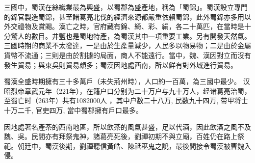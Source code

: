 三國中，蜀漢在絲織業最為興盛，以蜀郡為盛產地，稱為「蜀錦」。蜀漢設立專門的錦官製造蜀錦，甚至諸葛亮北伐的經濟來源都嚴重依賴蜀錦，此外蜀錦亦多用以外交禮物及賞賜。漢亡之時，官府藏有錦、綺、彩、絹，各二十萬匹，在當時是十分驚人的數目。井鹽也是蜀地特產，為蜀漢其中一項重要工業。另有開發天然氣。三國時期的商業不太發達，一是由於生產量減少，人民多以物易物；二是由於金屬貨幣不流通；三則是由於割據的局面，商人不能遠行。當中，魏、漢因對立而沒有發生貿易；與東吳則貿易頗多；蜀漢因地處西南，所以鮮有對外域進行貿易。

蜀漢全盛時期擁有三十多萬戶（未失荊州時），人口約一百萬，為三國中最少。 汉昭烈帝章武元年（221年），在籍户口分别为二十万户与九十万人，经诸葛亮治蜀，至蜀亡时（263年）共有1082000人 ，其中户数二十八万, 民数九十四万, 带甲将士十万二千, 官吏四万, 當中蜀郡擁有戶口最多。

因地處著名產茶的西南地區，所以飲茶的風氣甚盛，足以代酒，因此飲酒之風不及魏、吳。民間亦有拜祭鬼神，諸葛亮死後，劉禪初期不與立廟，百姓仍在路上祭祀。朝廷中，蜀漢後期，劉禪聽信黃皓、陳祗巫鬼之說，最後間接令蜀漢被曹魏入侵。




